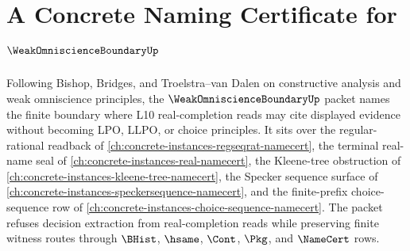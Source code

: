 \chapter{A Concrete Naming Certificate for $\WeakOmniscienceBoundaryUp$}
\label{ch:concrete-instances-weak-omniscience-boundary-namecert}

Following Bishop, Bridges, and Troelstra--van Dalen on constructive analysis and weak omniscience principles, the $\WeakOmniscienceBoundaryUp$ packet names the finite boundary where L10 real-completion reads may cite displayed evidence without becoming LPO, LLPO, or choice principles. It sits over the regular-rational readback of \autoref{ch:concrete-instances-regseqrat-namecert}, the terminal real-name seal of \autoref{ch:concrete-instances-real-namecert}, the Kleene-tree obstruction of \autoref{ch:concrete-instances-kleene-tree-namecert}, the Specker sequence surface of \autoref{ch:concrete-instances-speckersequence-namecert}, and the finite-prefix choice-sequence row of \autoref{ch:concrete-instances-choice-sequence-namecert}. The packet refuses decision extraction from real-completion reads while preserving finite witness routes through $\BHist$, $\hsame$, $\Cont$, $\Pkg$, and $\NameCert$ rows.

